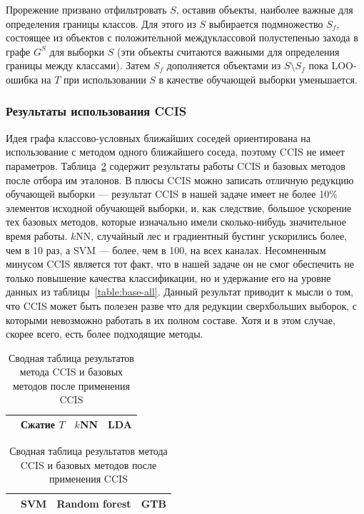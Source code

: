 Прорежение призвано отфильтровать \(S\), оставив объекты, наиболее важные для определения границы классов. Для этого из \(S\) выбирается подмножество \(S_f\), состоящее из объектов с положительной междуклассовой полустепенью захода в графе \(G^S\) для выборки \(S\) (эти объекты считаются важными для определения границы между классами). Затем \(S_f\) дополняется объектами из \(S\setminus S_f\) пока LOO-ошибка на \(T\) при использовании \(S\) в качестве обучающей выборки уменьшается.

\subsubsection*{Результаты использования CCIS}
Идея графа классово-условных ближайших соседей ориентирована на использование с методом одного ближайшего соседа, поэтому CCIS не имеет параметров. Таблица~\ref{table:ccis-results} содержит результаты работы CCIS и базовых методов после отбора им эталонов. В плюсы CCIS можно записать отличную редукцию обучающей выборки --- результат CCIS в нашей задаче имеет не более 10\% элементов исходной обучающей выборки, и, как следствие, большое ускорение тех базовых методов, которые изначально имели сколько-нибудь значительное время работы. \(k\)NN, случайный лес и градиентный бустинг ускорились более, чем в 10 раз, а SVM --- более, чем в 100, на всех каналах. Несомненным минусом CCIS является тот факт, что в нашей задаче он не смог обеспечить не только повышение качества классификации, но и удержание его на уровне данных из таблицы~\ref{table:base-all}. Данный результат приводит к мысли о том, что CCIS может быть полезен разве что для редукции сверхбольших выборок, с которыми невозможно работать в их полном составе. Хотя и в этом случае, скорее всего, есть более подходящие методы.

\begin{table}[h!]
    \centering
    \begin{tabular}{|c||c||c|c|}
    \cline{2-4}
    \multicolumn{1}{c||}{} & Сжатие \(T\) & \(k\)NN & LDA \\
    \hline \hline
	
\end{tabular}
\newline \vspace*{0.5cm} \newline
\begin{tabular}{|c||c|c|c|}
    \cline{2-4}
    \multicolumn{1}{c||}{} & SVM & Random forest & GTB \\
    \hline \hline
	
    \end{tabular}
    \caption{Сводная таблица результатов метода CCIS и базовых методов после применения CCIS}
    \label{table:ccis-results}
\end{table}

